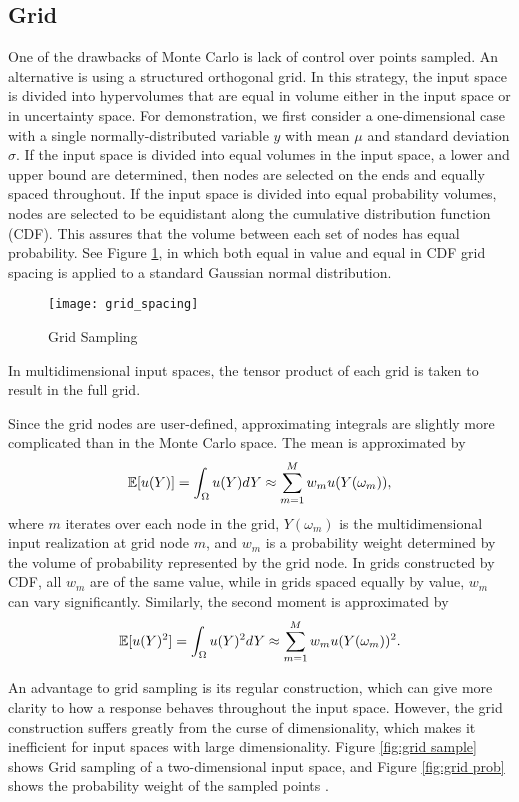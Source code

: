 \subsection{Grid}
One of the drawbacks of Monte Carlo is lack of control over points sampled.
An alternative is using a structured orthogonal grid.  In this strategy, the input space is
divided into hypervolumes that are equal in volume either in the input space or in uncertainty space.  For
demonstration, we first consider a one-dimensional case with a single normally-distributed variable $y$ with mean
$\mu$ and standard deviation $\sigma$.  If the input space is divided into equal volumes in the input space,
a lower and upper bound are determined,
then nodes are selected on the ends and equally spaced throughout.  If the input space is
divided into equal probability volumes, nodes are selected to be equidistant along the cumulative distribution
function (CDF).  This assures that the volume between each set of nodes has equal probability.  See Figure
\ref{fig:grid samp}, in which both equal in value and equal in CDF grid spacing is applied to a standard Gaussian
normal distribution.
\begin{figure}[htb]
  \centering
  \texttt{[image: grid\_spacing]}
  \caption{Grid Sampling}
  \label{fig:grid samp}
\end{figure}
In multidimensional input spaces, the tensor product of each grid is taken to result in the full grid.

Since the grid nodes are user-defined, approximating integrals are slightly more complicated than in the Monte
Carlo space.  The mean is approximated by
\begin{equation}
  \mathbb{E}[ u(Y)] = \int_\Omega u(Y) dY \approx \sum_{m=1}^M w_m u(Y(\omega_m)),
\end{equation}
where $m$ iterates over each node in the grid, $Y(\omega_m)$ is the multidimensional input realization at grid node $m$, and
$w_m$ is a probability weight determined by the volume of probability represented by the grid node.  In grids
constructed by CDF, all $w_m$ are of the same value, while in grids spaced equally by value, $w_m$ can vary
significantly.  Similarly, the second moment is approximated by
\begin{equation}
  \mathbb{E}[ u(Y)^2] = \int_\Omega u(Y)^2 dY \approx \sum_{m=1}^M w_m u(Y(\omega_m))^2.
\end{equation}

An advantage to grid sampling is its regular construction, which can give more clarity to how a response
behaves throughout the input space.  However, the grid construction suffers greatly from the curse of
dimensionality, which makes it inefficient for input spaces with large dimensionality.
Figure \ref{fig:grid sample}
shows Grid sampling of a two-dimensional input space, and Figure \ref{fig:grid prob} shows the
probability weight of the sampled points \cite{raven}.

